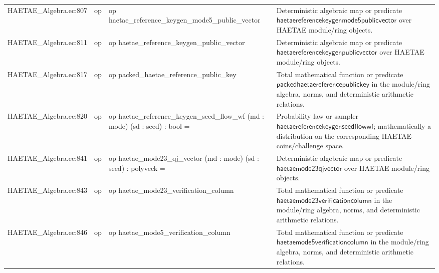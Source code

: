 \documentclass[10pt]{article}
\begin{document}
\begin{longtable}{L{0.11\textwidth}L{0.055\textwidth}L{0.385\textwidth}L{0.41\textwidth}}
HAETAE\_\allowbreak{}Algebra.\allowbreak{}ec:\allowbreak{}807 & op & {\ttfamily\scriptsize op haetae\_\allowbreak{}reference\_\allowbreak{}keygen\_\allowbreak{}mode5\_\allowbreak{}public\_\allowbreak{}vector} & Deterministic algebraic map or predicate $\mathsf{haetaereferencekeygenmode5publicvector}$ over HAETAE module/ring objects. \\
HAETAE\_\allowbreak{}Algebra.\allowbreak{}ec:\allowbreak{}811 & op & {\ttfamily\scriptsize op haetae\_\allowbreak{}reference\_\allowbreak{}keygen\_\allowbreak{}public\_\allowbreak{}vector} & Deterministic algebraic map or predicate $\mathsf{haetaereferencekeygenpublicvector}$ over HAETAE module/ring objects. \\
HAETAE\_\allowbreak{}Algebra.\allowbreak{}ec:\allowbreak{}817 & op & {\ttfamily\scriptsize op packed\_\allowbreak{}haetae\_\allowbreak{}reference\_\allowbreak{}public\_\allowbreak{}key} & Total mathematical function or predicate $\mathsf{packedhaetaereferencepublickey}$ in the module/ring algebra, norms, and deterministic arithmetic relations. \\
HAETAE\_\allowbreak{}Algebra.\allowbreak{}ec:\allowbreak{}820 & op & {\ttfamily\scriptsize op haetae\_\allowbreak{}reference\_\allowbreak{}keygen\_\allowbreak{}seed\_\allowbreak{}flow\_\allowbreak{}wf (md : mode) (sd : seed) : bool =} & Probability law or sampler $\mathsf{haetaereferencekeygenseedflowwf}$; mathematically a distribution on the corresponding HAETAE coins/challenge space. \\
HAETAE\_\allowbreak{}Algebra.\allowbreak{}ec:\allowbreak{}841 & op & {\ttfamily\scriptsize op haetae\_\allowbreak{}mode23\_\allowbreak{}qj\_\allowbreak{}vector (md : mode) (sd : seed) : polyveck =} & Deterministic algebraic map or predicate $\mathsf{haetaemode23qjvector}$ over HAETAE module/ring objects. \\
HAETAE\_\allowbreak{}Algebra.\allowbreak{}ec:\allowbreak{}843 & op & {\ttfamily\scriptsize op haetae\_\allowbreak{}mode23\_\allowbreak{}verification\_\allowbreak{}column} & Total mathematical function or predicate $\mathsf{haetaemode23verificationcolumn}$ in the module/ring algebra, norms, and deterministic arithmetic relations. \\
HAETAE\_\allowbreak{}Algebra.\allowbreak{}ec:\allowbreak{}846 & op & {\ttfamily\scriptsize op haetae\_\allowbreak{}mode5\_\allowbreak{}verification\_\allowbreak{}column} & Total mathematical function or predicate $\mathsf{haetaemode5verificationcolumn}$ in the module/ring algebra, norms, and deterministic arithmetic relations. \\

\end{longtable}
\end{document}
